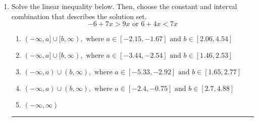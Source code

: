 \documentclass[14pt]{extbook}
\newcommand{\litem}[1]{\item#1\hspace*{-1cm}\rule{\textwidth}{0.4pt}}
\begin{document}
\begin{enumerate}
{\begin{enumerate}[label=\Alph*.]
\end{enumerate} }
\litem{
Solve the linear inequality below. Then, choose the constant and interval combination that describes the solution set.\[ -6 + 7 x > 9 x \text{ or } 6 + 4 x < 7 x \]\begin{enumerate}[label=\Alph*.]
\item \( (-\infty, a] \cup [b, \infty), \text{ where } a \in [-2.15, -1.67] \text{ and } b \in [2.06, 4.54] \)
\item \( (-\infty, a] \cup [b, \infty), \text{ where } a \in [-3.44, -2.54] \text{ and } b \in [1.46, 2.53] \)
\item \( (-\infty, a) \cup (b, \infty), \text{ where } a \in [-5.33, -2.92] \text{ and } b \in [1.65, 2.77] \)
\item \( (-\infty, a) \cup (b, \infty), \text{ where } a \in [-2.4, -0.75] \text{ and } b \in [2.7, 4.88] \)
\item \( (-\infty, \infty) \)

\end{enumerate} }
\end{enumerate}
\end{document}
